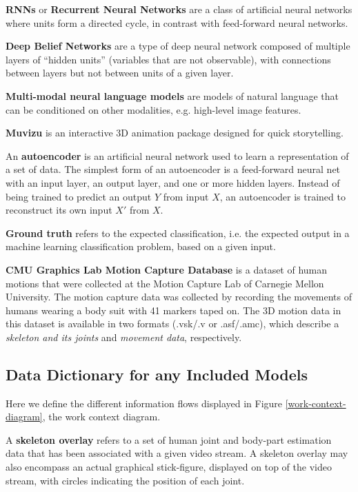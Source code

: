 \documentclass{scrreprt}
\begin{document}
\textbf{RNNs} or \textbf{Recurrent Neural Networks} are a class of artificial
neural networks where units form a directed cycle, in contrast with
feed-forward neural networks.

\textbf{Deep Belief Networks} are a type of deep neural network composed of
multiple layers of ``hidden units'' (variables that are not observable), with
connections between layers but not between units of a given layer.

\textbf{Multi-modal neural language models} are models of natural language that
can be conditioned on other modalities, e.g. high-level image
features\cite{DBLP:journals/corr/KirosSZ14}.

\textbf{Muvizu} is an interactive 3D animation package designed for quick storytelling.

An \textbf{autoencoder} is an artificial neural network used to learn a
representation of a set of data. The simplest form of an autoencoder is a
feed-forward neural net with an input layer, an output layer, and one or more
hidden layers. Instead of being trained to predict an output $Y$ from input
$X$, an autoencoder is trained to reconstruct its own input $X'$ from $X$.

\textbf{Ground truth} refers to the expected classification, i.e. the expected
output in a machine learning classification problem, based on a given input.

\textbf{CMU Graphics Lab Motion Capture Database} is a dataset of human motions
that were collected at the Motion Capture Lab of Carnegie Mellon University.
The motion capture data was collected by recording the movements of humans
wearing a body suit with 41 markers taped on. The 3D motion data in this
dataset is available in two formats (.vsk/.v or .asf/.amc), which describe a
\textit{skeleton and its joints} and \textit{movement data}, respectively.

\subsection{Data Dictionary for any Included Models}

Here we define the different information flows displayed in Figure
\ref{work-context-diagram}, the work context diagram.

A \textbf{skeleton overlay} refers to a set of human joint and body-part
estimation data that has been associated with a given video stream. A skeleton
overlay may also encompass an actual graphical stick-figure, displayed on top
of the video stream, with circles indicating the position of each joint.
\end{document}
